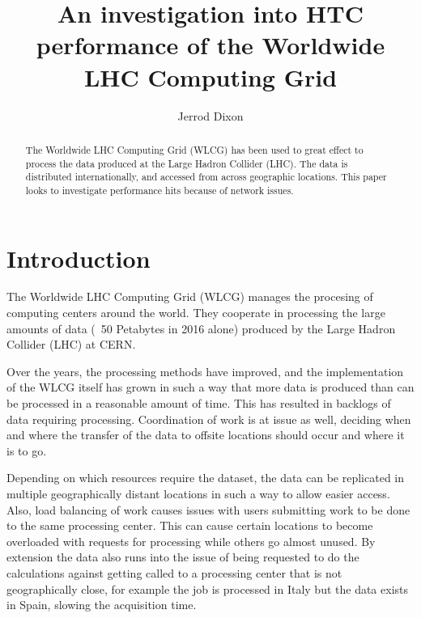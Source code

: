 \documentclass[print,ms]{nuthesis}
\begin{document}
\frontmatter
\title{An investigation into HTC performance of the Worldwide LHC Computing Grid}
\author{Jerrod Dixon}

\maketitle

\begin{abstract}
The Worldwide LHC Computing Grid (WLCG) has been used to great effect to process the data produced at the Large Hadron Collider (LHC). The data is distributed internationally, and accessed from across geographic locations. This paper looks to investigate performance hits because of network issues.
\end{abstract}

\begin{acknowledgments}
	
\end{acknowledgments}


\tableofcontents
\newpage
\listoffigures
\listoftables

\mainmatter
\chapter{Introduction}
\label{sec:Introduction}
The Worldwide LHC Computing Grid (WLCG)\cite{wlcg} manages the procesing of computing centers around the world. They cooperate in processing the large amounts of data (~50 Petabytes in 2016 alone) produced by the Large Hadron Collider (LHC) at CERN.

Over the years, the processing methods have improved, and the implementation of the WLCG itself has grown in such a way that more data is produced than can be processed in a reasonable amount of time. This has resulted in backlogs of data requiring processing. Coordination of work is at issue as well, deciding when and where the transfer of the data to offsite locations should occur and where it is to go. 

Depending on which resources require the dataset, the data can be replicated in multiple geographically distant locations in such a way to allow easier access. Also, load balancing of work causes issues with users submitting work to be done to the same processing center. This can cause certain locations to become overloaded with requests for processing while others go almost unused. By extension the data also runs into the issue of being requested to do the calculations against getting called to a processing center that is not geographically close, for example the job is processed in Italy but the data exists in Spain, slowing the acquisition time. 
\end{document}
